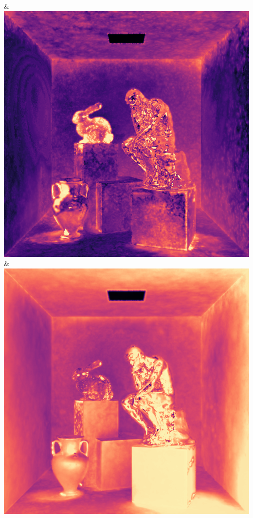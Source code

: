 & \includegraphics[width=\linewidth]{figures/py/tests/quality_comparison/nrc+pt_1spp_thinker_flip.png}
& \includegraphics[width=\linewidth]{figures/py/tests/quality_comparison/nrc+pt+sl_1spp_thinker_flip.png}
